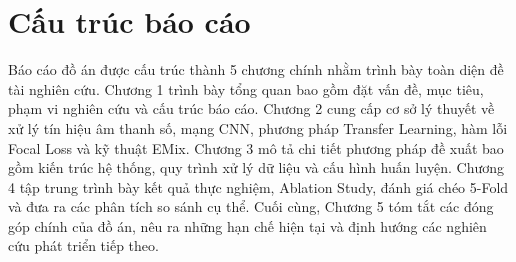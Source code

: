\section{Cấu trúc báo cáo}
\label{sec:report_structure}

Báo cáo đồ án được cấu trúc thành 5 chương chính nhằm trình bày toàn diện đề tài nghiên cứu. Chương 1 trình bày tổng quan bao gồm đặt vấn đề, mục tiêu, phạm vi nghiên cứu và cấu trúc báo cáo. Chương 2 cung cấp cơ sở lý thuyết về xử lý tín hiệu âm thanh số, mạng CNN, phương pháp Transfer Learning, hàm lỗi Focal Loss và kỹ thuật EMix. Chương 3 mô tả chi tiết phương pháp đề xuất bao gồm kiến trúc hệ thống, quy trình xử lý dữ liệu và cấu hình huấn luyện. Chương 4 tập trung trình bày kết quả thực nghiệm, Ablation Study, đánh giá chéo 5-Fold và đưa ra các phân tích so sánh cụ thể. Cuối cùng, Chương 5 tóm tắt các đóng góp chính của đồ án, nêu ra những hạn chế hiện tại và định hướng các nghiên cứu phát triển tiếp theo.
